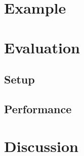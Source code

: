 \section{Example}

\section{Evaluation}

\subsection{Setup}

\subsection{Performance}

\section{Discussion}